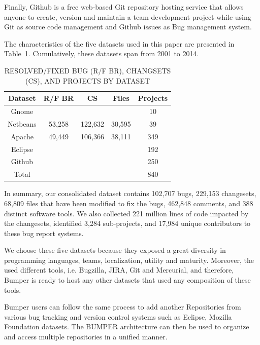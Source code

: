 \documentclass[conference]{IEEEtran}
\begin{document}
Finally, Github is a free web-based Git repository hosting service that allows anyone to create, version and maintain a team development project while using Git as source code management and Github issues as Bug management system.

The characteristics of the five datasets used in this paper are presented in Table~\ref{tab:summary}.
Cumulatively, these datasets span from 2001 to 2014.

\begin{table}[]
\centering
\caption{
RESOLVED/FIXED BUG (R/F BR),  CHANGSETS (CS), AND
PROJECTS BY DATASET}
\label{tab:summary}
\begin{tabular}{c|c|c|c|c}
\textbf{Dataset} & \textbf{R/F BR} & \textbf{CS} & \textbf{Files} & \textbf{Projects} \\ \hline \hline
Gnome            &                 &             &                & 10                \\ \hline
Netbeans         & 53,258          & 122,632     & 30,595         & 39                \\ \hline
Apache           & 49,449          & 106,366     & 38,111         & 349               \\ \hline
Eclipse          &                 &             &                & 192               \\ \hline
Github           &                 &             &                & 250               \\ \hline
Total            &                 &             &                & 840               \\ \hline \hline
\end{tabular}
\end{table}

In summary, our consolidated dataset contains 102,707 bugs, 229,153 changesets, 68,809 files that have been modified to fix the bugs, 462,848 comments, and 388 distinct software tools.
We also collected 221 million lines of code impacted by the changesets, identified 3,284 sub-projects, and 17,984 unique contributors to these bug report systems.

We choose these five datasets because they exposed a great diversity in programming languages, teams, localization, utility and maturity.
Moreover, the used different tools, i.e.
Bugzilla, JIRA, Git and Mercurial, and therefore, Bumper is ready to host any other datasets that used any composition of these tools.

Bumper users can follow the same process to add another
Repositories from various bug tracking and version control
systems such as Eclipse, Mozilla Foundation datasets. The BUMPER architecture can then be used to organize and
access multiple repositories in a unified manner.
\end{document}
